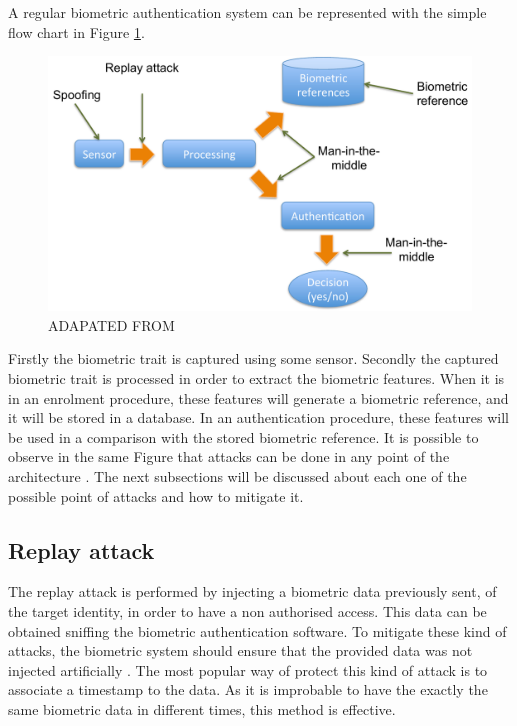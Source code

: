 A regular biometric authentication system can be represented with the simple flow chart in Figure \ref{fig:diagram_attacks}.
\begin{figure}[!htb]
\begin{center}
\includegraphics [width=14cm] {images/diagram_attacks.pdf}
\caption[]{ADAPATED FROM} \label{fig:diagram_attacks}
\end{center}
\end{figure}

Firstly the biometric trait is captured using some sensor. Secondly the captured biometric trait is processed in order to extract the biometric features. When it is in an enrolment procedure, these features will generate a biometric reference, and it will be stored in a database. In an authentication procedure, these features will be used in a comparison with the stored biometric reference. It is possible to observe in the same Figure that attacks can be done in any point of the architecture \cite{xiao2005security}. The next subsections will be discussed about each one of the possible point of attacks and how to mitigate it.


\label{sec:AttacksBiometric}

\subsection{Replay attack}

The replay attack is performed by injecting a biometric data previously sent, of the target identity, in order to have a non authorised access. This data can be obtained sniffing the biometric authentication software. To mitigate these kind of attacks, the biometric system should ensure that the provided data was not injected artificially \cite{xiao2005security}. The most  popular way of protect this kind of attack is to associate a timestamp to the data. As it is improbable to have the exactly the same biometric data in different times, this method is effective.

